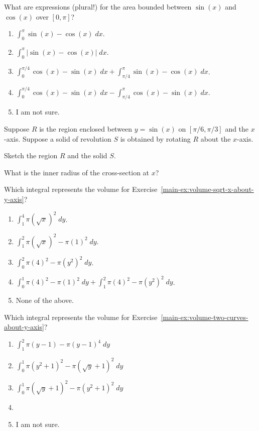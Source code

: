 \documentclass[aspectratio=169, 14pt, t]{beamer}  %
\begin{document}
\begin{poll}
  What are expressions (plural!) for the area bounded between \(\sin(x)\) and \(\cos(x)\) over \([0, \pi]\)?

  \begin{enumerate} \setlength\itemsep{1ex}
    \item \(\int_{0}^{\pi} \sin(x) - \cos(x) \;dx\).
    \item \(\int_{0}^{\pi} |\sin(x) - \cos(x)| \;dx\).
    \item \(\int_{0}^{\pi/4} \cos(x) - \sin(x) \;dx + \int_{\pi/4}^{\pi} \sin(x) - \cos(x) \;dx\).
    \item \(\int_{0}^{\pi/4} \cos(x) - \sin(x) \;dx - \int_{\pi/4}^{\pi} \cos(x) - \sin(x) \;dx\).
    \item I am not sure.
  \end{enumerate}
\end{poll}

\begin{poll}
  Suppose \(R\) is the region enclosed between \(y = \sin(x)\) on \([\pi/6, \pi/3]\) and the \(x\)-axis.  Suppose a solid of revolution \(S\) is obtained by rotating \(R\) about the \(x\)-axis.

  Sketch the region \(R\) and the solid \(S\).

  What is the inner radius of the cross-section at \(x\)?
\end{poll}

\begin{poll}
  Which integral represents the volume for Exercise~\ref{main-ex:volume-sqrt-x-about-y-axis}?

  \begin{enumerate}
    \item \(\int_{1}^{4} \pi \left( \sqrt{x} \right)^{2} \;dy\).
    \item \(\int_{1}^{2} \pi \left( \sqrt{x} \right)^{2} - \pi \left( 1 \right)^{2} \;dy\).
    \item \(\int_{0}^{2} \pi \left( 4 \right)^{2} - \pi \left( y^{2} \right)^{2} \;dy\).
    \item \(\int_{0}^{1} \pi \left( 4 \right)^{2} - \pi \left( 1 \right)^{2} \;dy + \int_{1}^{2} \pi \left( 4 \right)^{2} - \pi \left( y^{2} \right)^{2} \; dy\).
    \item None of the above.
  \end{enumerate}
\end{poll}

\begin{poll}
  Which integral represents the volume for Exercise~\ref{main-ex:volume-two-curves-about-y-axis}?

  \begin{enumerate}
    \item \(\int_{1}^{2} \pi (y - 1) - \pi (y-1)^{4} \;dy\)
    \item \(\int_{0}^{1} \pi (y^{2}+1)^{2} - \pi (\sqrt{y} + 1)^{2} \;dy\)
    \item \(\int_{0}^{1} \pi (\sqrt{y} + 1)^{2} - \pi (y^{2}+1)^{2} \;dy\)
    \item
    \item I am not sure.
  \end{enumerate}
\end{poll}
\end{document}
